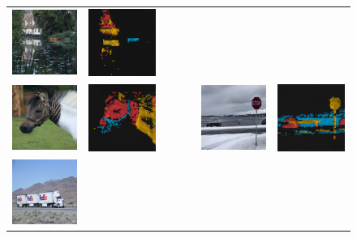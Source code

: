 \begin{figure}[t]
\begin{tabular}{cc ccc cc}
	\includegraphics[width=.24\linewidth]{3425.png}&
	\includegraphics[width=.24\linewidth]{bnw-3425.png}
\\
	\includegraphics[width=.24\linewidth]{3272.png}&
	\includegraphics[width=.24\linewidth]{bnw-3272.png}&&&&
	\includegraphics[width=.24\linewidth]{2032.png}&
	\includegraphics[width=.24\linewidth]{bnw-2032.png}
\\
	\includegraphics[width=.24\linewidth]{1791.png}&

\end{tabular}
\end{figure}
